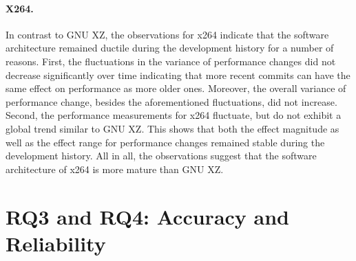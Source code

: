 \paragraph{X264.} In contrast to GNU XZ, the observations for x264 indicate that
the software architecture remained ductile during the development history for a number of
reasons. First, the fluctuations in the variance of performance changes did not
decrease significantly over time indicating that more recent commits can have
the same effect on performance as more older ones. Moreover, the overall
variance of performance change, besides the aforementioned fluctuations, did
not increase. Second, the performance measurements for x264 fluctuate, but do
not exhibit a global trend similar to GNU XZ. This shows that both the effect
magnitude as well as the effect range for performance changes remained stable
during the development history. All in all, the observations suggest that the software architecture of x264 is
more mature than GNU XZ.

\section{RQ3 and RQ4: Accuracy and Reliability}
